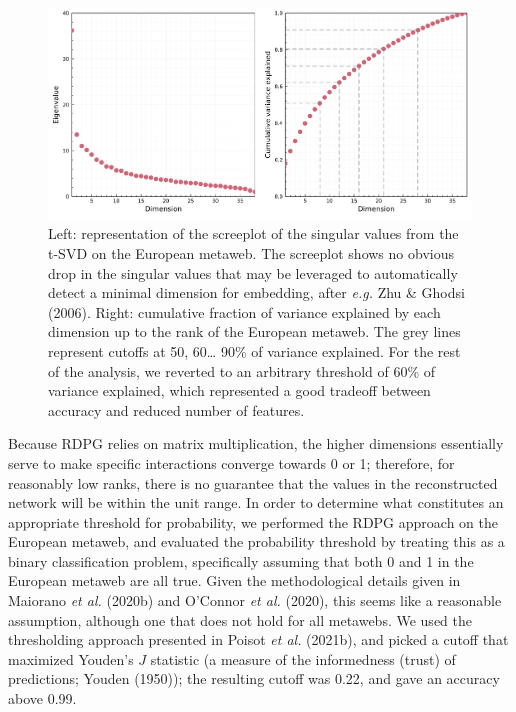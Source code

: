 \documentclass[10pt,oneside]{article}
\makeatletter
\def\maxwidth{\ifdim\Gin@nat@width>\linewidth\linewidth
\else\Gin@nat@width\fi}
\let\Oldincludegraphics\includegraphics
\renewcommand{\includegraphics}[1]{\Oldincludegraphics[width=\maxwidth]{#1}}
\makeatother
\begin{document}
\begin{figure}
\hypertarget{fig:scree}{%
\centering
\includegraphics{figures/figure-screeplot.png}
\caption{Left: representation of the screeplot of the singular values
from the t-SVD on the European metaweb. The screeplot shows no obvious
drop in the singular values that may be leveraged to automatically
detect a minimal dimension for embedding, after \emph{e.g.} Zhu \&
Ghodsi (2006). Right: cumulative fraction of variance explained by each
dimension up to the rank of the European metaweb. The grey lines
represent cutoffs at 50, 60\ldots{} 90\% of variance explained. For the
rest of the analysis, we reverted to an arbitrary threshold of 60\% of
variance explained, which represented a good tradeoff between accuracy
and reduced number of features.}\label{fig:scree}
}
\end{figure}

Because RDPG relies on matrix multiplication, the higher dimensions
essentially serve to make specific interactions converge towards 0 or 1;
therefore, for reasonably low ranks, there is no guarantee that the
values in the reconstructed network will be within the unit range. In
order to determine what constitutes an appropriate threshold for
probability, we performed the RDPG approach on the European metaweb, and
evaluated the probability threshold by treating this as a binary
classification problem, specifically assuming that both 0 and 1 in the
European metaweb are all true. Given the methodological details given in
Maiorano \emph{et al.} (2020b) and O'Connor \emph{et al.} (2020), this
seems like a reasonable assumption, although one that does not hold for
all metawebs. We used the thresholding approach presented in Poisot
\emph{et al.} (2021b), and picked a cutoff that maximized Youden's \(J\)
statistic (a measure of the informedness (trust) of predictions; Youden
(1950)); the resulting cutoff was 0.22, and gave an accuracy above 0.99.
\end{document}
